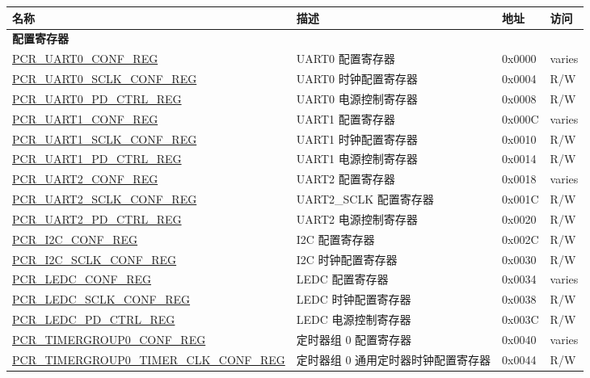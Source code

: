 \begin{longtable}{ | p{7cm} | p{6.2cm} | p{1.3cm} | p{1cm} | }
\hline\rowcolor{lightgray}
\textbf{名称} & \textbf{描述} &  \textbf{地址} & \textbf{访问} \\ \hline
\endhead
\multicolumn{4}{|l|}{\textbf{配置寄存器}} \\ \hline
\hyperref[regdesc:PCRUART0CONFREG]{PCR\_UART0\_CONF\_REG} & UART0 配置寄存器 & 0x0000 & varies \\ \hline
\hyperref[regdesc:PCRUART0SCLKCONFREG]{PCR\_UART0\_SCLK\_CONF\_REG} & UART0 时钟配置寄存器 & 0x0004 & R/W \\ \hline
\hyperref[regdesc:PCRUART0PDCTRLREG]{PCR\_UART0\_PD\_CTRL\_REG} & UART0 电源控制寄存器 & 0x0008 & R/W \\ \hline
\hyperref[regdesc:PCRUART1CONFREG]{PCR\_UART1\_CONF\_REG} & UART1 配置寄存器 & 0x000C & varies \\ \hline
\hyperref[regdesc:PCRUART1SCLKCONFREG]{PCR\_UART1\_SCLK\_CONF\_REG} & UART1 时钟配置寄存器 & 0x0010 & R/W \\ \hline
\hyperref[regdesc:PCRUART1PDCTRLREG]{PCR\_UART1\_PD\_CTRL\_REG} & UART1 电源控制寄存器 & 0x0014 & R/W \\ \hline
\hyperref[regdesc:PCRUART2CONFREG]{PCR\_UART2\_CONF\_REG} & UART2 配置寄存器 & 0x0018 & varies \\ \hline
\hyperref[regdesc:PCRUART2SCLKCONFREG]{PCR\_UART2\_SCLK\_CONF\_REG} & UART2\_SCLK 配置寄存器 & 0x001C & R/W \\ \hline
\hyperref[regdesc:PCRUART2PDCTRLREG]{PCR\_UART2\_PD\_CTRL\_REG} & UART2 电源控制寄存器 & 0x0020 & R/W \\ \hline
\hyperref[regdesc:PCRI2CCONFREG]{PCR\_I2C\_CONF\_REG} & I2C 配置寄存器 & 0x002C & R/W \\ \hline
\hyperref[regdesc:PCRI2CSCLKCONFREG]{PCR\_I2C\_SCLK\_CONF\_REG} & I2C 时钟配置寄存器 & 0x0030 & R/W \\ \hline
\hyperref[regdesc:PCRLEDCCONFREG]{PCR\_LEDC\_CONF\_REG} & LEDC 配置寄存器 & 0x0034 & varies \\ \hline
\hyperref[regdesc:PCRLEDCSCLKCONFREG]{PCR\_LEDC\_SCLK\_CONF\_REG} & LEDC 时钟配置寄存器 & 0x0038 & R/W \\ \hline
\hyperref[regdesc:PCRLEDCPDCTRLREG]{PCR\_LEDC\_PD\_CTRL\_REG} & LEDC 电源控制寄存器 & 0x003C & R/W \\ \hline
\hyperref[regdesc:PCRTIMERGROUP0CONFREG]{PCR\_TIMERGROUP0\_CONF\_REG} & 定时器组 0 配置寄存器 & 0x0040 & varies \\ \hline
\hyperref[regdesc:PCRTIMERGROUP0TIMERCLKCONFREG]{PCR\_TIMERGROUP0\_TIMER\_CLK\_CONF\_REG} & 定时器组 0 通用定时器时钟配置寄存器 & 0x0044 & R/W \\ \hline

\end{longtable}
